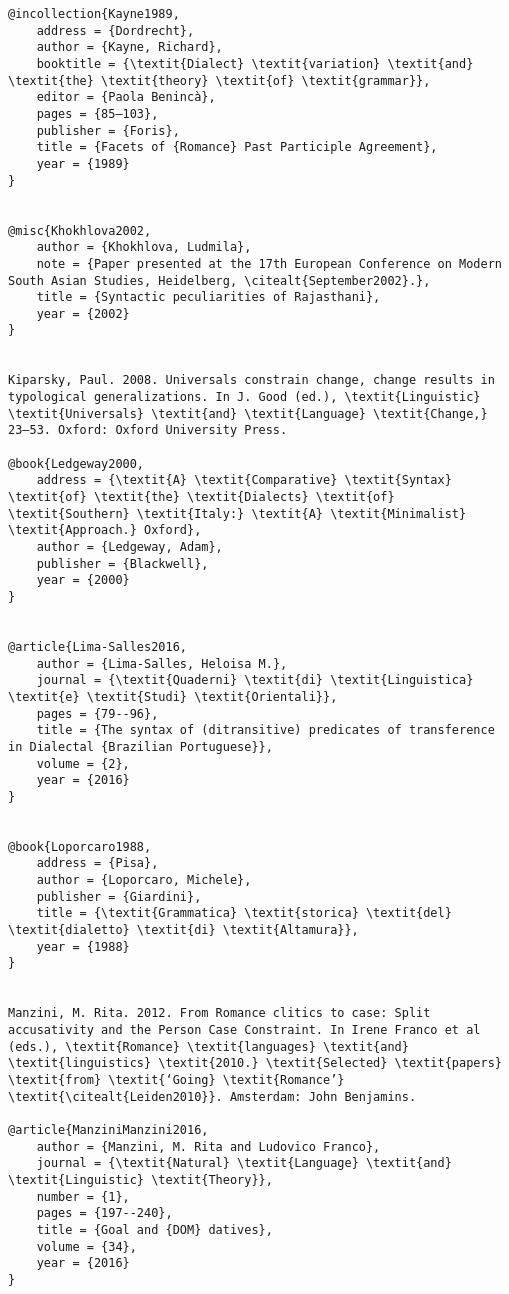 \documentclass[output=paper]{langscibook}
\begin{document}
\begin{verbatim}
@incollection{Kayne1989,
	address = {Dordrecht},
	author = {Kayne, Richard},
	booktitle = {\textit{Dialect} \textit{variation} \textit{and} \textit{the} \textit{theory} \textit{of} \textit{grammar}},
	editor = {Paola Benincà},
	pages = {85–103},
	publisher = {Foris},
	title = {Facets of {Romance} Past Participle Agreement},
	year = {1989}
}


@misc{Khokhlova2002,
	author = {Khokhlova, Ludmila},
	note = {Paper presented at the 17th European Conference on Modern South Asian Studies, Heidelberg, \citealt{September2002}.},
	title = {Syntactic peculiarities of Rajasthani},
	year = {2002}
}


Kiparsky, Paul. 2008. Universals constrain change, change results in typological generalizations. In J. Good (ed.), \textit{Linguistic} \textit{Universals} \textit{and} \textit{Language} \textit{Change,} 23–53. Oxford: Oxford University Press.

@book{Ledgeway2000,
	address = {\textit{A} \textit{Comparative} \textit{Syntax} \textit{of} \textit{the} \textit{Dialects} \textit{of} \textit{Southern} \textit{Italy:} \textit{A} \textit{Minimalist} \textit{Approach.} Oxford},
	author = {Ledgeway, Adam},
	publisher = {Blackwell},
	year = {2000}
}


@article{Lima-Salles2016,
	author = {Lima-Salles, Heloisa M.},
	journal = {\textit{Quaderni} \textit{di} \textit{Linguistica} \textit{e} \textit{Studi} \textit{Orientali}},
	pages = {79--96},
	title = {The syntax of (ditransitive) predicates of transference in Dialectal {Brazilian Portuguese}},
	volume = {2},
	year = {2016}
}


@book{Loporcaro1988,
	address = {Pisa},
	author = {Loporcaro, Michele},
	publisher = {Giardini},
	title = {\textit{Grammatica} \textit{storica} \textit{del} \textit{dialetto} \textit{di} \textit{Altamura}},
	year = {1988}
}


Manzini, M. Rita. 2012. From Romance clitics to case: Split accusativity and the Person Case Constraint. In Irene Franco et al (eds.), \textit{Romance} \textit{languages} \textit{and} \textit{linguistics} \textit{2010.} \textit{Selected} \textit{papers} \textit{from} \textit{‘Going} \textit{Romance’} \textit{\citealt{Leiden2010}}. Amsterdam: John Benjamins.

@article{ManziniManzini2016,
	author = {Manzini, M. Rita and Ludovico Franco},
	journal = {\textit{Natural} \textit{Language} \textit{and} \textit{Linguistic} \textit{Theory}},
	number = {1},
	pages = {197--240},
	title = {Goal and {DOM} datives},
	volume = {34},
	year = {2016}
}



\end{verbatim}
\end{document}
